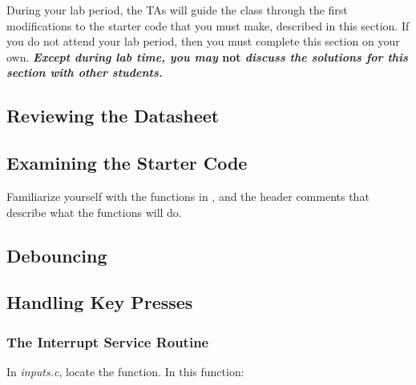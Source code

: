 During your lab period, the TAs will guide the class through the first modifications to the starter code that you must make, described in this section.
If you do not attend your lab period, then you must complete this section on your own.
\textbf{\textit{Except during lab time, you may }not\textit{ discuss the solutions for this section with other students.}}


\subsection{Reviewing the Datasheet}



\subsection{Examining the Starter Code}

Familiarize yourself with the functions in \requiredfiles, and the header comments that describe what the functions will do.

\subsection{Debouncing} \label{subsec:debouncing}



\subsection{Handling Key Presses}


\subsubsection{The Interrupt Service Routine}

In \textit{inputs.c}, locate the  function.
In this function:
\begin{description}
\end{description}

